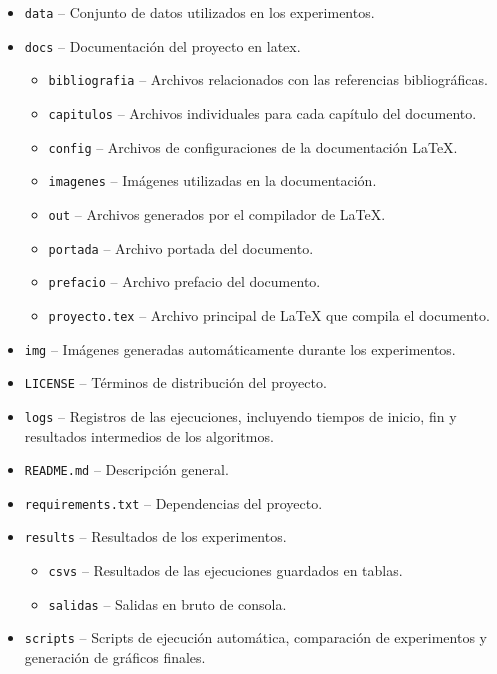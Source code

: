 \begin{itemize}
      \item \texttt{data} -- Conjunto de datos utilizados en los experimentos.
      \item \texttt{docs} -- Documentación del proyecto en latex.
            \begin{itemize}
                  \item \texttt{bibliografia} -- Archivos relacionados con las referencias bibliográficas.
                  \item \texttt{capitulos} -- Archivos individuales para cada capítulo del documento.
                  \item \texttt{config} -- Archivos de configuraciones de la documentación LaTeX.
                  \item \texttt{imagenes} -- Imágenes utilizadas en la documentación.
                  \item \texttt{out} -- Archivos generados por el compilador de LaTeX.
                  \item \texttt{portada} -- Archivo portada del documento.
                  \item \texttt{prefacio} -- Archivo prefacio del documento.
                  \item \texttt{proyecto.tex} -- Archivo principal de LaTeX que compila el documento.
            \end{itemize}
      \item \texttt{img} -- Imágenes generadas automáticamente durante los experimentos.
      \item \texttt{LICENSE} -- Términos de distribución del proyecto.
      \item \texttt{logs} -- Registros de las ejecuciones, incluyendo tiempos de inicio, fin y resultados intermedios de los algoritmos.
      \item \texttt{README.md} -- Descripción general.
      \item \texttt{requirements.txt} -- Dependencias del proyecto.
      \item \texttt{results} -- Resultados de los experimentos.
            \begin{itemize}
                  \item \texttt{csvs} -- Resultados de las ejecuciones guardados en tablas.
                  \item \texttt{salidas} -- Salidas en bruto de consola.
            \end{itemize}
      \item \texttt{scripts} -- Scripts de ejecución automática, comparación de experimentos y generación de gráficos finales.

\end{itemize}
